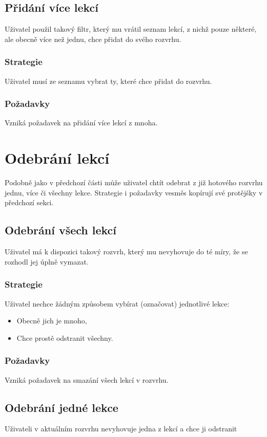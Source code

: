\documentclass[a4paper, 11pt]{article}
\begin{document}
\subsection{Přidání více lekcí}
Uživatel použil takový filtr, který mu vrátil seznam lekcí, z nichž pouze některé, ale obecně více než jednu, chce přidat do svého rozvrhu.

\subsubsection{Strategie}
Uživatel musí ze seznamu vybrat ty, které chce přidat do rozvrhu.

\subsubsection{Požadavky}
Vzniká požadavek na přidání více lekcí z mnoha.

\section{Odebrání lekcí}
Podobně jako v předchozí části může uživatel chtít odebrat z již hotového rozvrhu jednu, více či všechny lekce. Strategie i požadavky vesměs kopírují své protějšky v předchozí sekci.

\subsection{Odebrání všech lekcí}
Uživatel má k dispozici takový rozvrh, který mu nevyhovuje do té míry, že se rozhodl jej úplně vymazat.

\subsubsection{Strategie}
Uživatel nechce žádným způsobem vybírat (označovat) jednotlivé lekce:
\begin{itemize}
\item Obecně jich je mnoho,
\item Chce prostě odstranit všechny.
\end{itemize}

\subsubsection{Požadavky}
Vzniká požadavek na smazání všech lekcí v rozvrhu.

\subsection{Odebrání jedné lekce}
Uživateli v aktuálním rozvrhu nevyhovuje jedna z lekcí a chce ji odstranit
\end{document}
